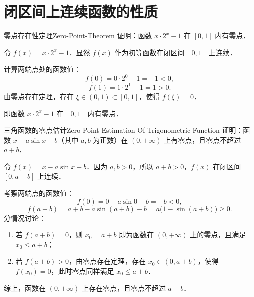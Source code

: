 \section{闭区间上连续函数的性质}

\begin{problem}{零点存在性定理}{Zero-Point-Theorem}
    证明：函数 $x \cdot 2^x - 1$ 在 $[0, 1]$ 内有零点．
\end{problem}

\begin{myproof}
    令 $f(x) = x \cdot 2^x - 1$．显然 $f(x)$ 作为初等函数在闭区间 $[0, 1]$ 上连续．

    计算两端点处的函数值：
    \begin{equation}
        f(0) = 0 \cdot 2^0 - 1 = -1 < 0,
    \end{equation}
    \begin{equation}
        f(1) = 1 \cdot 2^1 - 1 = 1 > 0.
    \end{equation}
    由零点存在定理，存在 $\xi \in (0, 1) \subset [0, 1]$，使得 $f(\xi) = 0$．

    即函数 $x \cdot 2^x - 1$ 在 $[0, 1]$ 内有零点．
\end{myproof}

\begin{problem}{三角函数的零点估计}{Zero-Point-Estimation-Of-Trigonometric-Function}
    证明：函数 $x - a\sin x - b$（其中 $a, b$ 为正数）在 $(0, +\infty)$ 上有零点，且零点不超过 $a+b$．
\end{problem}

\begin{myproof}
    令 $f(x) = x - a\sin x - b$．因为 $a, b > 0$，所以 $a + b > 0$，$f(x)$ 在闭区间 $[0, a+b]$ 上连续．

    考察两端点的函数值：
    \begin{equation}
        f(0) = 0 - a\sin 0 - b = -b < 0,
    \end{equation}
    \begin{equation}
        f(a+b) = a + b - a\sin(a+b) - b = a\bigl( 1 - \sin(a+b) \bigr) \geqslant 0.
    \end{equation}
    分情况讨论：
    \begin{enumerate}
        \item 若 $f(a+b) = 0$，则 $x_0 = a + b$ 即为函数在 $(0, +\infty)$ 上的零点，且满足 $x_0 \leqslant a+b$；
        \item 若 $f(a+b) > 0$，由零点存在定理，存在 $x_0 \in (0, a+b)$，使得 $f(x_0) = 0$，此时零点同样满足 $x_0 \leqslant a+b$．
    \end{enumerate}
    综上，函数在 $(0, +\infty)$ 上存在零点，且零点不超过 $a+b$．
\end{myproof}

